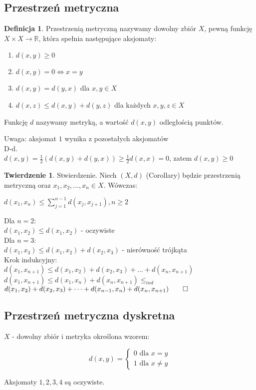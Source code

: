 \documentclass{article}
\theoremstyle{definition}
\newtheorem{de}{Definicja}[subsection]
\theoremstyle{definition}
\newtheorem{tw}{Twierdzenie}[subsection]
\theoremstyle{definition}
\theoremstyle{definition}
\begin{document}
\subsection{Przestrzeń metryczna}

\begin{de}
Przestrzenią metryczną nazywamy dowolny zbiór $X$, pewną funkcję $X\times X \rightarrow \mathbb{R}$,
która spełnia następujące aksjomaty:
\begin{enumerate}
    \item $d(x,y)\geq 0$
    \item $d(x,y)=0 \iff x=y$
    \item $d(x,y)=d(y,x)$ dla $x,y\in X$
    \item $d(x,z)\leq d(x,y) + d(y,z)$ dla każdych $x,y,z \in X$
\end{enumerate}
Funkcję $d$ nazywamy metryką, a wartość $d(x,y)$ odległością punktów.

\end{de}
Uwaga: aksjomat $1$ wynika z pozostałych aksjomatów\\
D-d.\\
$d(x,y) = \frac{1}{2} \left(d(x,y)+d(y,x)\right) \geq \frac{1}{2} d(x,x) = 0$, zatem $d(x,y)\geq 0$

\begin{tw}
Stwierdzenie. Niech $(X,d)$ (Corollary) będzie przestrzenią metryczną oraz $x_1,x_2,\dots,x_n\in X$.
Wówczas:
\begin{center}
    $d(x_1,x_n)\leq\sum_{j=1}^{n-1} d(x_j,x_{j+1}), n\geq 2$
\end{center}
Dla $n=2$:\\
    $d(x_1,x_2)\leq d(x_1,x_2)$ - oczywiste\\
Dla $n=3$:\\
    $d(x_1,x_3)\leq d(x_1,x_2) + d(x_2,x_3)$ - nierówność trójkąta\\
Krok indukcyjny:\\
    $d(x_1,x_{n+1})\leq d(x_1,x_2)+d(x_2,x_3)+\dots+d(x_n,x_{n+1})$\\
    $d(x_1,x_{n+1})\leq d(x_1,x_n)+d(x_n,x_{n+1}) \leq_{ind}$
    $d(x_1,x_2) + d(x_2,x_3) + \dots + d(x_{n-1}, x_n) + d(x_{n},x_{n+1})\qed$
\end{tw}

\subsection{Przestrzeń metryczna dyskretna}

$X$ - dowolny zbiór i metryka określona wzorem:
\begin{center}
    $$d(x,y)=\begin{cases}
        0 \text{ dla } x=y\\
        1 \text{ dla } x\neq y
    \end{cases}$$
\end{center}
Aksjomaty $1,2,3,4$ są oczywiste.
\end{document}
